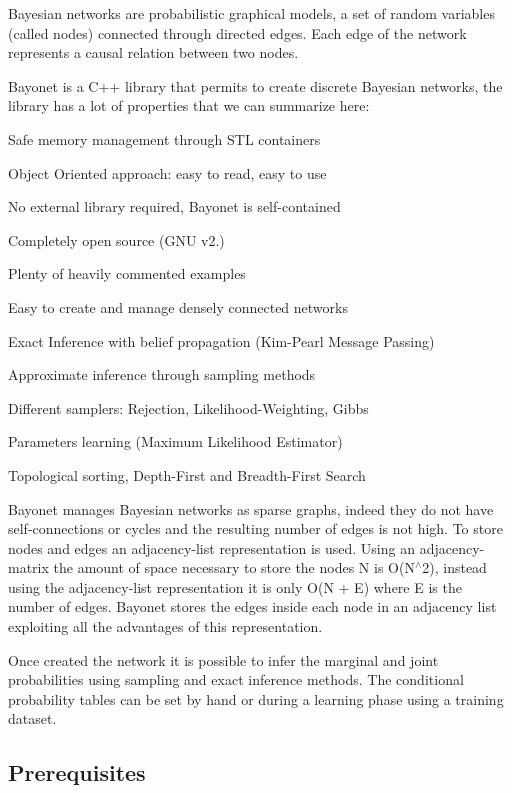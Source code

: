 Bayesian networks are probabilistic graphical models, a set of random variables (called nodes) connected through directed edges. Each edge of the network represents a causal relation between two nodes.

Bayonet is a C++ library that permits to create discrete Bayesian networks, the library has a lot of properties that we can summarize here\-:


\begin{DoxyItemize}
\item Safe memory management through S\-T\-L containers
\item Object Oriented approach\-: easy to read, easy to use
\item No external library required, Bayonet is self-\/contained
\item Completely open source (G\-N\-U v2.)
\item Plenty of heavily commented examples
\item Easy to create and manage densely connected networks
\item Exact Inference with belief propagation (Kim-\/\-Pearl Message Passing)
\item Approximate inference through sampling methods
\item Different samplers\-: Rejection, Likelihood-\/\-Weighting, Gibbs
\item Parameters learning (Maximum Likelihood Estimator)
\item Topological sorting, Depth-\/\-First and Breadth-\/\-First Search
\end{DoxyItemize}

Bayonet manages Bayesian networks as sparse graphs, indeed they do not have self-\/connections or cycles and the resulting number of edges is not high. To store nodes and edges an adjacency-\/list representation is used. Using an adjacency-\/matrix the amount of space necessary to store the nodes N is O(\-N$^\wedge$2), instead using the adjacency-\/list representation it is only O(N + E) where E is the number of edges. Bayonet stores the edges inside each node in an adjacency list exploiting all the advantages of this representation.

Once created the network it is possible to infer the marginal and joint probabilities using sampling and exact inference methods. The conditional probability tables can be set by hand or during a learning phase using a training dataset.

\subsection*{Prerequisites }

